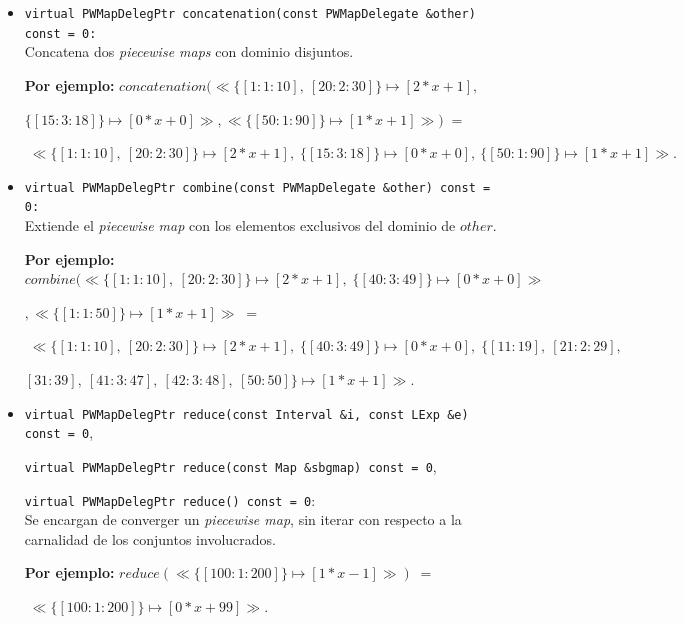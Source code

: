 \begin{itemize}
    \item \texttt{virtual PWMapDelegPtr concatenation(const PWMapDelegate \&other) const = 0:} \\
    Concatena dos \textit{piecewise maps} con dominio disjuntos.

    \begin{center}
        \textbf{Por ejemplo:} $concatenation(\ll\{[1:1:10],\ [20:2:30]\} \mapsto [2*x+1],\; $
        
        $\{[15:3:18]\} \mapsto [0*x+0]\gg, \ll\{[50:1:90]\} \mapsto [1*x+1]\gg)\;=$
        
        $\;\ll\{[1:1:10],\ [20:2:30]\} \mapsto [2*x+1],\;\{[15:3:18]\} \mapsto [0*x+0],\ \{[50:1:90]\} \mapsto [1*x+1]\gg.$
    \end{center}

    \item \texttt{virtual PWMapDelegPtr combine(const PWMapDelegate \&other) const = 0:} \\
    Extiende el \textit{piecewise map} con los elementos exclusivos del dominio de $other$.

        \begin{center}
        \textbf{Por ejemplo:} $combine(\ll\{[1:1:10],\ [20:2:30]\} \mapsto [2*x+1],\; \{[40:3:49]\} \mapsto [0*x+0]\gg$
        
        $, \ll\{[1:1:50]\} \mapsto [1*x+1]\gg\;=$
        
        $\;\ll\{[1:1:10],\ [20:2:30]\} \mapsto [2*x+1],\; \{[40:3:49]\} \mapsto [0*x+0],\; \{[11:19],\ [21:2:29],\ $
        
        $[31:39],\ [41:3:47],\ [42:3:48],\ [50:50]\} \mapsto [1*x+1]\gg.$
    \end{center}

    \item \texttt{virtual PWMapDelegPtr reduce(const Interval \&i, const LExp \&e) const = 0},\par \texttt{virtual PWMapDelegPtr reduce(const Map \&sbgmap) const = 0}, \par \texttt{virtual PWMapDelegPtr reduce() const = 0}: \\
    Se encargan de converger un \textit{piecewise map}, sin iterar con respecto a la carnalidad de los conjuntos involucrados.

            \begin{center}
        \textbf{Por ejemplo:} $reduce(\ll\{[100:1:200]\} \mapsto [1*x-1]\gg)\;=$
        
        $\;\ll\{[100:1:200]\} \mapsto [0*x+99] \gg.$
    \end{center}


\end{itemize}
